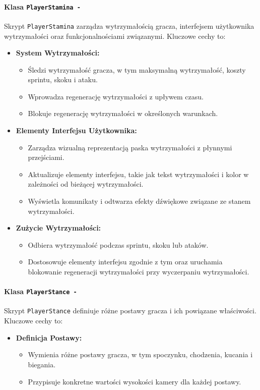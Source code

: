 \paragraph{Klasa \texttt{PlayerStamina -}}
Skrypt \texttt{PlayerStamina} zarządza wytrzymałością gracza, interfejsem użytkownika wytrzymałości oraz funkcjonalnościami związanymi. Kluczowe cechy to:
\begin{itemize}
  \item \textbf{System Wytrzymałości:}
    \begin{itemize}
      \item Śledzi wytrzymałość gracza, w tym maksymalną wytrzymałość, koszty sprintu, skoku i ataku.
      \item Wprowadza regenerację wytrzymałości z upływem czasu.
      \item Blokuje regenerację wytrzymałości w określonych warunkach.
    \end{itemize}
  \item \textbf{Elementy Interfejsu Użytkownika:}
    \begin{itemize}
      \item Zarządza wizualną reprezentacją paska wytrzymałości z płynnymi przejściami.
      \item Aktualizuje elementy interfejsu, takie jak tekst wytrzymałości i kolor w zależności od bieżącej wytrzymałości.
      \item Wyświetla komunikaty i odtwarza efekty dźwiękowe związane ze stanem wytrzymałości.
    \end{itemize}
  \item \textbf{Zużycie Wytrzymałości:}
    \begin{itemize}
      \item Odbiera wytrzymałość podczas sprintu, skoku lub ataków.
      \item Dostosowuje elementy interfejsu zgodnie z tym oraz uruchamia blokowanie regeneracji wytrzymałości przy wyczerpaniu wytrzymałości.
    \end{itemize}
\end{itemize}

\paragraph{Klasa \texttt{PlayerStance -}}
Skrypt \texttt{PlayerStance} definiuje różne postawy gracza i ich powiązane właściwości. Kluczowe cechy to:
\begin{itemize}
  \item \textbf{Definicja Postawy:}
    \begin{itemize}
      \item Wymienia różne postawy gracza, w tym spoczynku, chodzenia, kucania i biegania.
      \item Przypisuje konkretne wartości wysokości kamery dla każdej postawy.
    \end{itemize}
\end{itemize}

